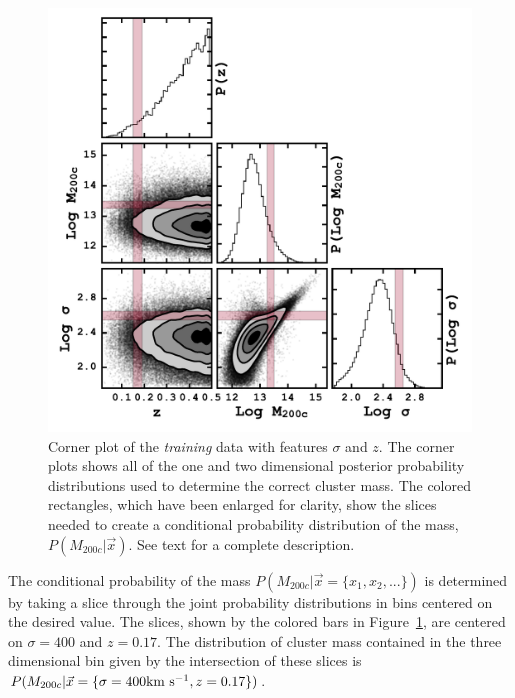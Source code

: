 \documentclass[fleqn,usenatbib]{mnras}
\begin{document}
\begin{figure} 
	\includegraphics[width=\columnwidth]{figures/cornertest.pdf} 
	\caption{Corner plot of the \emph{training} data with features $\sigma$ and $z$. The corner plots shows all of the one and two dimensional posterior probability distributions used to determine the correct cluster mass. The colored rectangles, which have been enlarged for clarity, show the slices needed to create a conditional probability distribution of the mass, $P(M_{200c}|\vec{x})$. See text for a complete description. } \label{fig: probability corner} 
\end{figure}

The conditional probability of the mass $P(M_{200c}|\vec{x}= \{ x_1,x_2,...\})$ is determined by taking a slice through the joint probability distributions in bins centered on the desired value. The slices, shown by the colored bars in Figure~\ref{fig: probability corner}, are centered on $\sigma = 400$ \kms and $z=0.17$. The distribution of cluster mass contained in the three dimensional bin given by the intersection of these slices is $P(M_{200c}|\vec{x} = \{\sigma=400 \hbox{km~s$^{-1}$},z=0.17\})$.
\end{document}
